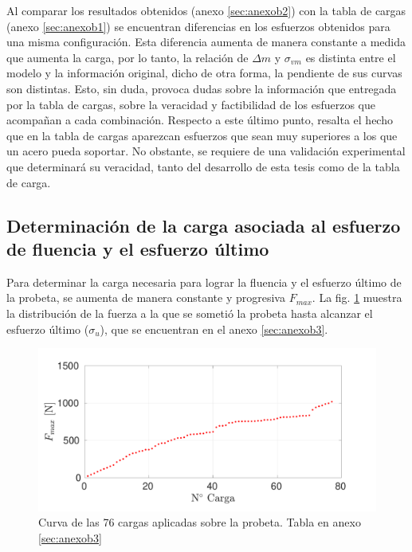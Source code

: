 Al comparar los resultados obtenidos (anexo \ref{sec:anexob2}) con la tabla de cargas (anexo \ref{sec:anexob1}) se encuentran diferencias en los esfuerzos obtenidos para una misma configuración. Esta diferencia aumenta de manera constante a medida que aumenta la carga, por lo tanto, la relación de $\Delta m$ y $\sigma_{vm}$ es distinta entre el modelo y la información original, dicho de otra forma, la pendiente de sus curvas son distintas. Esto, sin duda, provoca dudas sobre la información que entregada por la tabla de cargas, sobre la veracidad y factibilidad de los esfuerzos que acompañan a cada combinación. Respecto a este último punto, resalta el hecho que en la tabla de cargas aparezcan esfuerzos que sean muy superiores a los que un acero pueda soportar. No obstante, se requiere de una validación experimental que determinará su veracidad, tanto del desarrollo de esta tesis como de la tabla de carga.

\newpage

\subsection{Determinación de la carga asociada al esfuerzo de fluencia y el esfuerzo último}

Para determinar la carga necesaria para lograr la fluencia y el esfuerzo último de la probeta, se aumenta de manera constante y progresiva $F_{max}$. La fig. \ref{fig:f_step} muestra la distribución de la fuerza a la que se sometió la probeta hasta alcanzar el esfuerzo último ($\sigma_u$), que se encuentran en el anexo \ref{sec:anexob3}.

\begin{figure}[h]
\centering
\includegraphics[width=1\linewidth, trim={0cm 0cm 1cm 0cm}, clip]{Imagenes/f_step.pdf}
\caption{Curva de las 76 cargas aplicadas sobre la probeta. Tabla en anexo \ref{sec:anexob3}}
\label{fig:f_step}
\end{figure}

